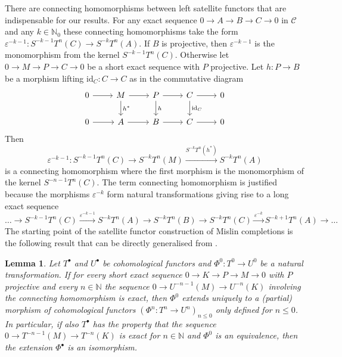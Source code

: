 \documentclass[12pt,a4paper]{article}
\numberwithin{equation}{section}
\newtheorem{lem}[thm]{Lemma}
\theoremstyle{nonumberplain}
\begin{document}
There are connecting homomorphisms between left satellite functors that are indispensable for our results. For any exact sequence $0 \rightarrow A \rightarrow B \rightarrow C \rightarrow 0$ in $\mathcal{C}$ and any $k \in \mathbb{N}_0$ these connecting homomorphisms take the form $\varepsilon^{-k-1}: S^{-k-1}T^n(C) \rightarrow S^{-k}T^n(A)$. If $B$ is projective, then $\varepsilon^{-k-1}$ is the monomorphism from the kernel $S^{-k-1}T^n(C)$. Otherwise let $0 \rightarrow M \rightarrow P \rightarrow C \rightarrow 0$ be a short exact sequence with $P$ projective. Let $h: P \rightarrow B$ be a morphism lifting $\mathrm{id}_C: C \rightarrow C$ as in the commutative diagram
\begin{equation}\label{diag:delta}
\begin{tikzcd}
  0 \arrow[r]
    &M \arrow[r] \arrow[d, "h^{\ast}"]
    &P \arrow[r] \arrow[d, "h"]
    &C \arrow[r] \arrow[d, "\mathrm{id}_{C}"]
    &0 \\
 0 \arrow[r]
    &A \arrow[r]
    &B \arrow[r]
    &C \arrow[r]
    &0
\end{tikzcd}
\end{equation}
Then 
\[ \varepsilon^{-k-1}: S^{-k-1}T^n(C) \rightarrow S^{-k}T^n(M) \xrightarrow{S^{-k}T^n(h^{\ast})} S^{-k}T^n(A) \]
is a connecting homomorphism where the first morphism is the monomorphism of the kernel $S^{-n-1}T^n(C)$. The term connecting homomorphism is justified because the morphisms $\varepsilon^{-k}$ form natural transformations giving rise to a long exact sequence
\[ \dots {} \rightarrow S^{-k-1}T^n(C) \xrightarrow{\varepsilon^{-k-1}} S^{-k}T^n(A) \rightarrow S^{-k}T^n(B) \rightarrow S^{-k}T^n(C) \xrightarrow{\varepsilon^{-k}} S^{-k+1}T^n(A) \rightarrow {} \dots \]
The starting point of the satellite functor construction of Mislin completions is the following result that can be directly generalised from \cite[Proposition~III.5.2]{car56}.

\begin{lem}\label{lem:uniqueness}
Let $T^{\bullet}$ and $U^{\bullet}$ be cohomological functors and $\Phi^0: T^0 \rightarrow U^0$ be a natural transformation. If for every short exact sequence $0 \rightarrow K \rightarrow P \rightarrow M \rightarrow 0$ with $P$ projective and every $n \in \mathbb{N}$ the sequence $0 \rightarrow U^{-n-1}(M) \rightarrow U^{-n}(K)$ involving the connecting homomorphism is exact, then $\Phi^0$ extends uniquely to a (partial) morphism of cohomological functors $(\Phi^n: T^n \rightarrow U^n)_{n \leq 0}$ only defined for $n \leq 0$. In particular, if also $T^{\bullet}$ has the property that the sequence $0 \rightarrow T^{-n-1}(M) \rightarrow T^{-n}(K)$ is exact for $n \in \mathbb{N}$ and $\Phi^0$ is an equivalence, then the extension $\Phi^{\bullet}$ is an isomorphism.
\end{lem}
\end{document}
